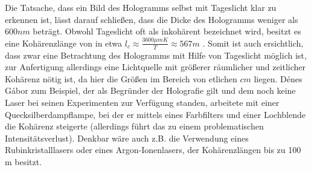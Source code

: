 \documentclass[bigchapter,colorback,accentcolor=tud4b,linedtoc,11pt]{tudreport}
\begin{document}
Die Tatsache, dass ein Bild des Hologramms selbst mit Tageslicht klar zu
erkennen ist, lässt darauf schließen, dass die Dicke des Hologramms weniger als
$600 nm$ beträgt. Obwohl Tageslicht oft als inkohärent bezeichnet wird,
besitzt es eine Kohärenzlänge von in etwa
$l_c \approx \frac{3600\mu m K}{T} \approx 567 m$ \cite{blackbodycoherence}. Somit ist auch
ersichtlich, dass zwar eine Betrachtung des Hologramms mit Hilfe von Tageslicht
möglich ist, zur Anfertigung allerdings eine Lichtquelle mit größerer räumlicher
und zeitlicher Kohärenz nötig ist, da hier die Größen im Bereich von etlichen
$cm$ liegen. Dénes Gábor zum Beispiel, der als Begründer der Holografie gilt und dem noch keine Laser bei seinen Experimenten zur Verfügung standen, arbeitete mit einer Quecksilberdampflampe, bei der er mittels eines Farbfilters und einer Lochblende die Kohärenz steigerte (allerdings führt das zu einem problematischen Intensitätsverlust). Denkbar wäre auch z.B. die Verwendung eines Rubinkristalllasers oder eines Argon-Ionenlasers, der Kohärenzlängen bis zu 100 m besitzt.
\end{document}
